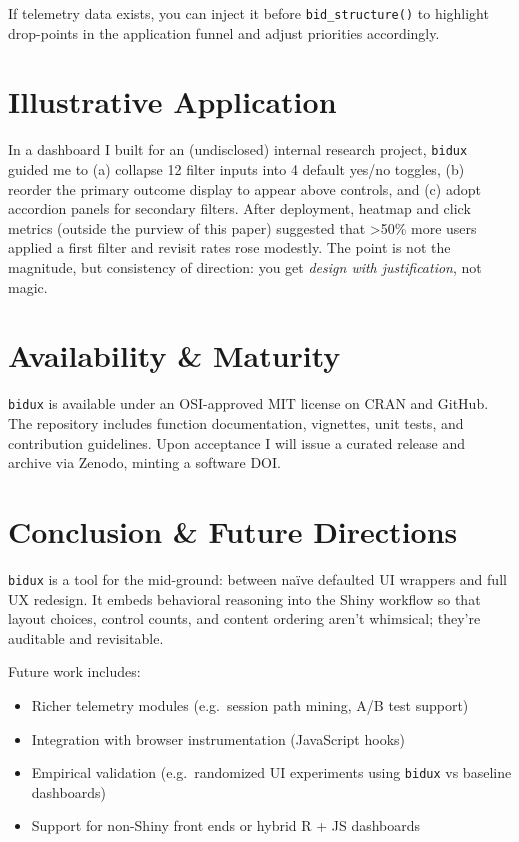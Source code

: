 \documentclass[
  authoryear,
  preprint]{elsarticle}
\providecommand{\tightlist}{%
  \setlength{\itemsep}{0pt}\setlength{\parskip}{0pt}}
\begin{document}
If telemetry data exists, you can inject it before
\texttt{bid\_structure()} to highlight drop-points in the application
funnel and adjust priorities accordingly.

\section{Illustrative Application}\label{illustrative-application}

In a dashboard I built for an (undisclosed) internal research project,
\texttt{bidux} guided me to (a) collapse 12 filter inputs into 4 default
yes/no toggles, (b) reorder the primary outcome display to appear above
controls, and (c) adopt accordion panels for secondary filters. After
deployment, heatmap and click metrics (outside the purview of this
paper) suggested that \textgreater50\% more users applied a first filter
and revisit rates rose modestly. The point is not the magnitude, but
consistency of direction: you get \emph{design with justification}, not
magic.

\section{Availability \& Maturity}\label{availability-maturity}

\texttt{bidux} is available under an OSI-approved MIT license on CRAN
and GitHub. The repository includes function documentation, vignettes,
unit tests, and contribution guidelines. Upon acceptance I will issue a
curated release and archive via Zenodo, minting a software DOI.

\section{Conclusion \& Future
Directions}\label{conclusion-future-directions}

\texttt{bidux} is a tool for the mid-ground: between naïve defaulted UI
wrappers and full UX redesign. It embeds behavioral reasoning into the
Shiny workflow so that layout choices, control counts, and content
ordering aren't whimsical; they're auditable and revisitable.

Future work includes:

\begin{itemize}
\tightlist
\item
  Richer telemetry modules (e.g.~session path mining, A/B test support)
\item
  Integration with browser instrumentation (JavaScript hooks)
\item
  Empirical validation (e.g.~randomized UI experiments using
  \texttt{bidux} vs baseline dashboards)
\item
  Support for non-Shiny front ends or hybrid R + JS dashboards
\end{itemize}
\end{document}
